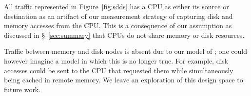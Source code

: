 All traffic represented in Figure~\ref{fig:sdds} has a CPU as either its source or destination as an artifact of our measurement strategy of capturing disk and memory accesses from the CPU. This is a consequence of our assumption as discussed in \S~\ref{sec:summary} that CPUs do not share memory or disk resources.

Traffic between memory and disk nodes is absent due to our model of \dis; one could however imagine a model in which this is no longer true. For example, disk accesses could be sent to the CPU that requested them while simultaneously being cached in remote memory. We leave an exploration of this design space to future work.


